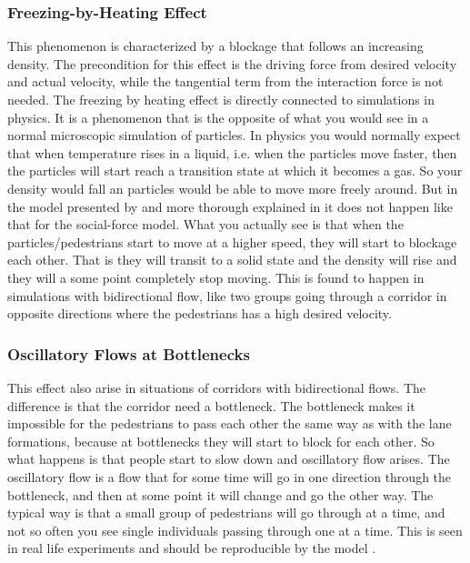 \subsubsection{Freezing-by-Heating Effect}
This phenomenon is characterized by a blockage that follows an increasing 
density. The precondition for this effect is the driving force from desired 
velocity and actual velocity, while the tangential term from the interaction 
force is not needed. The freezing by heating effect is directly connected to simulations in physics\cite{frebyheat}. It is a  phenomenon that is the opposite of what you would see in a normal microscopic simulation of particles. In physics you would normally expect that when temperature rises in a liquid, i.e. when the particles move faster, then the particles will start reach a transition state at which it becomes a gas. So your density would fall an particles would be able to move more freely around.
But in the model presented by \cite{self-org} and more thorough explained in \cite{frebyheat} it does not happen like that for the social-force model. What you actually see is that when the particles/pedestrians start to move at a higher speed, they will start to blockage each other. That is they will transit to a solid state and the density will rise and they will a some point completely stop moving. This is found to happen  in simulations  with bidirectional flow, like two groups going through a corridor in opposite directions where the pedestrians has a high desired velocity.        


\subsubsection{Oscillatory Flows at Bottlenecks}
This effect also arise in situations of corridors with bidirectional flows. The difference is that the corridor need a bottleneck. The bottleneck makes it impossible for the pedestrians to pass each other the same way as with the lane formations, because at bottlenecks they will start to block for each other. So what happens is that people start to slow down and oscillatory flow arises. The oscillatory flow is a flow that for some time will go in one direction through the bottleneck, and then at some point it will change and go the other way. The typical way is that a small group of pedestrians will go through  at a time, and not so often you see single individuals passing through one at a time. This is seen in real life experiments and should be reproducible by the model \cite{self-org} .



